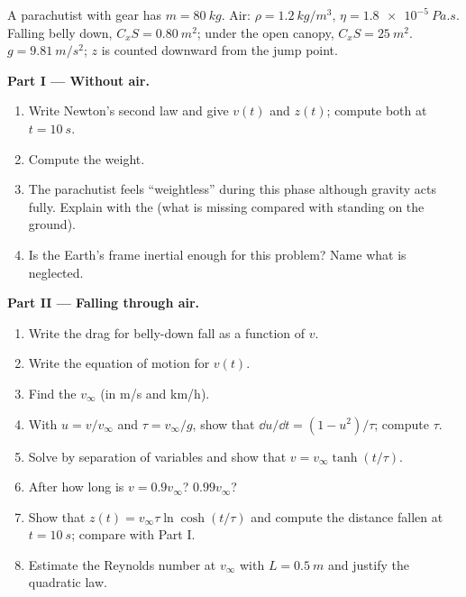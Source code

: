 \begin{problem}
\label{pb:b1:newton-dynamics:1}
A parachutist with gear has  $m = \qty{80}{kg}$. Air:
$\rho = \qty{1.2}{kg/m^3}$, $\eta = \qty{1.8e-5}{Pa.s}$. Falling belly
down, $C_xS = \qty{0.80}{m^2}$; under the open canopy, $C_xS =
\qty{25}{m^2}$. $g = \qty{9.81}{m/s^2}$; $z$ is counted downward from
the jump point.

\medskip
\noindent\textbf{Part I --- Without air.}
\begin{enumerate}
  \item Write Newton's second law and give $v(t)$ and $z(t)$; compute
        both at $t = \qty{10}{s}$.
  \item Compute the weight.
  \item The parachutist feels ``weightless'' during this phase although
        gravity acts fully. Explain with the  (what is missing
        compared with standing on the ground).
  \item Is the Earth's frame inertial enough for this problem? Name what
        is neglected.
\end{enumerate}

\medskip
\noindent\textbf{Part II --- Falling through air.}
\begin{enumerate}[resume]
  \item Write the drag  for belly-down fall as a function of $v$.
  \item Write the equation of motion for $v(t)$.
  \item Find the  $v_\infty$ (in \unit{m/s} and
        \unit{km/h}).
  \item With $u = v/v_\infty$ and $\tau = v_\infty/g$, show that
        $\dd u/\dd t = (1 - u^2)/\tau$; compute $\tau$.
  \item Solve by separation of variables and show that
        $v = v_\infty\tanh(t/\tau)$.
  \item After how long is $v = 0.9v_\infty$? $0.99v_\infty$?
  \item Show that $z(t) = v_\infty\tau\ln\cosh(t/\tau)$ and compute the
        distance fallen at $t = \qty{10}{s}$; compare with Part I.
  \item Estimate the Reynolds number at $v_\infty$ with $L = \qty{0.5}{m}$
        and justify the quadratic law.
\end{enumerate}


\end{problem}
